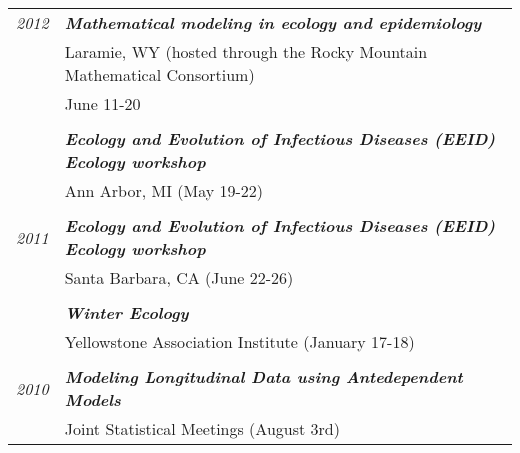\documentclass[9pt]{article}
\newenvironment{outerlist}[1][\enskip\textbullet]%
        {\begin{itemize}[#1]}{\end{itemize}%
         }
\newenvironment{innerlist}[1][\enskip\textbullet]%
        {\begin{compactitem}[#1]}{\end{compactitem}}
\begin{document}
\begin{tabular}{p{.5cm} p{15cm}}
\hspace{-1.75cm} \footnotesize{\textit{2012}} & \hspace{-.5cm}\textbf{\textit{Mathematical modeling in ecology and epidemiology}}\\
& Laramie, WY (hosted through the Rocky Mountain Mathematical Consortium)\\
& June 11-20\\
\\
& \hspace{-.5cm}\textbf{\textit{Ecology and Evolution of Infectious Diseases (EEID) Ecology workshop}}\\
& Ann Arbor, MI (May 19-22)\\
\\
\hspace{-1.75cm} \footnotesize{\textit{2011}} & \hspace{-.5cm}\textbf{\textit{Ecology and Evolution of Infectious Diseases (EEID) Ecology workshop}}\\
& Santa Barbara, CA (June 22-26)\\
\\
& \hspace{-.5cm}\textbf{\textit{Winter Ecology}}\\
& Yellowstone Association Institute (January 17-18) \\
\\
\hspace{-1.75cm} \footnotesize{\textit{2010}} & \hspace{-.5cm}\textbf{\textit{Modeling Longitudinal Data using Antedependent Models}}\\
& Joint Statistical Meetings (August 3rd) \\
\end{tabular}

%				
	
\end{document}
